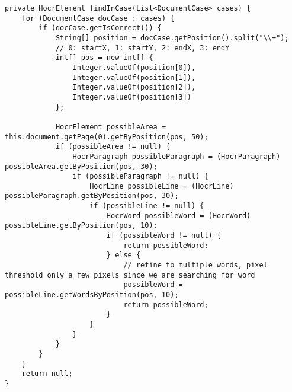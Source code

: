 \begin{lstlisting}
private HocrElement findInCase(List<DocumentCase> cases) {
    for (DocumentCase docCase : cases) {
        if (docCase.getIsCorrect()) {
            String[] position = docCase.getPosition().split("\\+");
            // 0: startX, 1: startY, 2: endX, 3: endY
            int[] pos = new int[] {
				Integer.valueOf(position[0]), 
				Integer.valueOf(position[1]), 
				Integer.valueOf(position[2]), 
				Integer.valueOf(position[3])
			};

            HocrElement possibleArea = this.document.getPage(0).getByPosition(pos, 50);
            if (possibleArea != null) {
                HocrParagraph possibleParagraph = (HocrParagraph)  possibleArea.getByPosition(pos, 30);
                if (possibleParagraph != null) {
                    HocrLine possibleLine = (HocrLine) possibleParagraph.getByPosition(pos, 30);
                    if (possibleLine != null) {
                        HocrWord possibleWord = (HocrWord) possibleLine.getByPosition(pos, 10);
                        if (possibleWord != null) {
                            return possibleWord;
                        } else {
                            // refine to multiple words, pixel threshold only a few pixels since we are searching for word
                            possibleWord = possibleLine.getWordsByPosition(pos, 10);
                            return possibleWord;
                        }
                    }
                }
            }
        }
    }
    return null;
}
\end{lstlisting}

